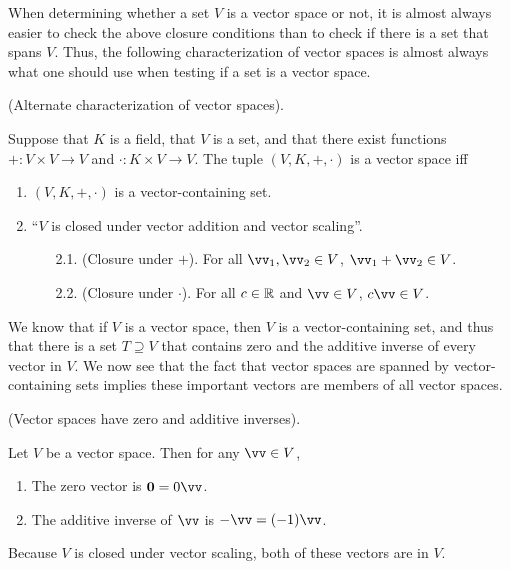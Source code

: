 When determining whether a set $V$ is a vector space or not, it is almost always easier to check the above closure conditions than to check if there is a set that spans $V$. Thus, the following characterization of vector spaces is almost always what one should use when testing if a set is a vector space.

\begin{theorem}
\label{ch::lin_alg::thm::vector_space_alt_characterization}
    (Alternate characterization of vector spaces).
    
    Suppose that $K$ is a field, that $V$ is a set, and that there exist functions $+:V \times V \rightarrow V$ and $\cdot:K \times V \rightarrow V$. The tuple $(V, K, +, \cdot)$ is a vector space iff
    
    \begin{enumerate}
        \item $(V, K, +, \cdot)$ is a vector-containing set.
        \item ``$V$ is closed under vector addition and vector scaling''.
        \begin{enumerate}
            \item[2.1.] (Closure under $+$). For all $\vv_1, \vv_2 \in V$, $\vv_1 + \vv_2 \in V$.
            \item[2.2.] (Closure under $\cdot$). For all $c \in \mathbb{R}$ and $\vv \in V$, $c \vv \in V$.
        \end{enumerate}
    \end{enumerate}
\end{theorem}

We know that if $V$ is a vector space, then $V$ is a vector-containing set, and thus that there is a set $T \supseteq V$ that contains zero and the additive inverse of every vector in $V$. We now see that the fact that vector spaces are spanned by vector-containing sets implies these important vectors are members of all vector spaces.

\begin{theorem}
    (Vector spaces have zero and additive inverses).

    Let $V$ be a vector space. Then for any $\vv \in V$,
    
    \begin{enumerate}
        \item The zero vector is $\mathbf{0} = 0\vv$.
        \item The additive inverse of $\vv$ is $-\vv = (-1)\vv$.
    \end{enumerate}

    Because $V$ is closed under vector scaling, both of these vectors are in $V$.
\end{theorem}

